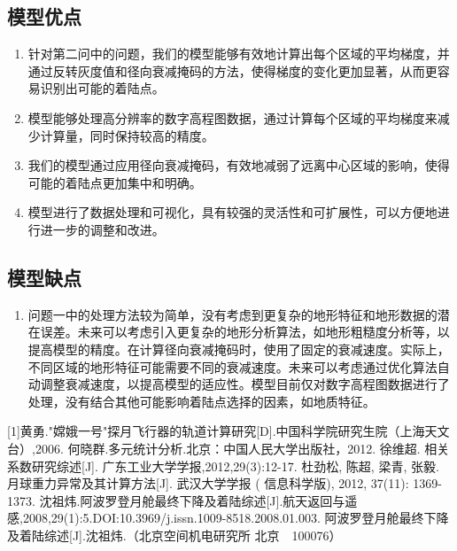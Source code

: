 \documentclass{ctexart}
\begin{document}
\subsection{模型优点}
\begin{enumerate}[(1)]
    \item 针对第二问中的问题，我们的模型能够有效地计算出每个区域的平均梯度，并通过反转灰度值和径向衰减掩码的方法，使得梯度的变化更加显著，从而更容易识别出可能的着陆点。
    \item 模型能够处理高分辨率的数字高程图数据，通过计算每个区域的平均梯度来减少计算量，同时保持较高的精度。
    \item 我们的模型通过应用径向衰减掩码，有效地减弱了远离中心区域的影响，使得可能的着陆点更加集中和明确。
    \item 模型进行了数据处理和可视化，具有较强的灵活性和可扩展性，可以方便地进行进一步的调整和改进。
\end{enumerate}

\subsection{模型缺点}
\begin{enumerate}[(1)]
    \item 问题一中的处理方法较为简单，没有考虑到更复杂的地形特征和地形数据的潜在误差。未来可以考虑引入更复杂的地形分析算法，如地形粗糙度分析等，以提高模型的精度。在计算径向衰减掩码时，使用了固定的衰减速度。实际上，不同区域的地形特征可能需要不同的衰减速度。未来可以考虑通过优化算法自动调整衰减速度，以提高模型的适应性。模型目前仅对数字高程图数据进行了处理，没有结合其他可能影响着陆点选择的因素，如地质特征。
\end{enumerate}


    \begin{thebibliography}{9} %
		[1]黄勇."嫦娥一号"探月飞行器的轨道计算研究[D].中国科学院研究生院（上海天文台）,2006.
		何晓群.多元统计分析.北京：中国人民大学出版社，2012.
		徐维超. 相关系数研究综述[J]. 广东工业大学学报,2012,29(3):12-17.
		杜劲松, 陈超, 梁青, 张毅. 月球重力异常及其计算方法[J]. 武汉大学学报 ( 信息科学版), 2012, 37(11): 1369-1373.
		沈祖炜.阿波罗登月舱最终下降及着陆综述[J].航天返回与遥感,2008,29(1):5.DOI:10.3969/j.issn.1009-8518.2008.01.003.
		阿波罗登月舱最终下降及着陆综述[J].沈祖炜.（北京空间机电研究所 北京　100076）

    \end{thebibliography}
\end{document}
